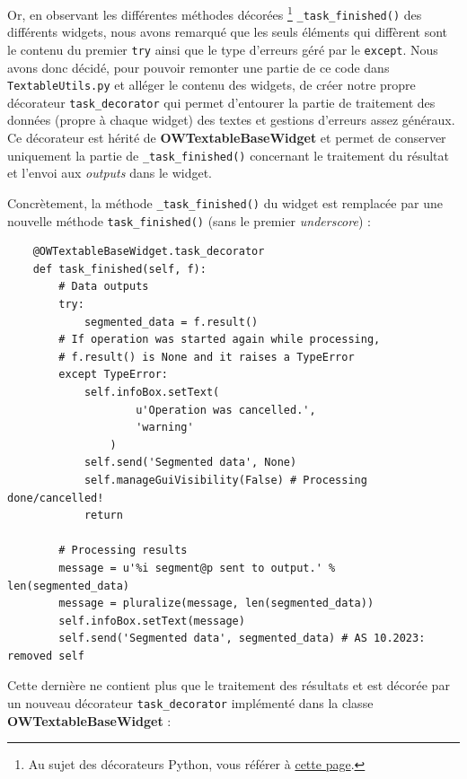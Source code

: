 \documentclass{article}
\begin{document}
\vspace{5mm}
Or, en observant les différentes méthodes décorées \footnote{Au sujet des décorateurs Python, vous référer à \href{https://www.geeksforgeeks.org/decorators-in-python/}{cette page}.} \texttt{\_task\_finished()} des différents widgets, nous avons remarqué que les seuls éléments qui diffèrent sont le contenu du premier \texttt{try} ainsi que le type d'erreurs géré par le \texttt{except}. Nous avons donc décidé, pour pouvoir remonter une partie de ce code dans \texttt{TextableUtils.py} et alléger le contenu des widgets, de créer notre propre décorateur \texttt{task\_decorator} qui permet d'entourer la partie de traitement des données (propre à chaque widget) des textes et gestions d'erreurs assez généraux. Ce décorateur est hérité de \textbf{OWTextableBaseWidget} et permet de conserver uniquement la partie de \texttt{\_task\_finished()} concernant le traitement du résultat et l'envoi aux \textit{outputs} dans le widget.

Concrètement, la méthode \texttt{\_task\_finished()} du widget est remplacée par une nouvelle méthode \texttt{task\_finished()} (sans le premier \textit{underscore}) : 

\begin{verbatim}
    @OWTextableBaseWidget.task_decorator
    def task_finished(self, f):
        # Data outputs
        try:
            segmented_data = f.result()
        # If operation was started again while processing,
        # f.result() is None and it raises a TypeError
        except TypeError:
            self.infoBox.setText(
                    u'Operation was cancelled.',
                    'warning'
                )
            self.send('Segmented data', None)
            self.manageGuiVisibility(False) # Processing done/cancelled!
            return

        # Processing results
        message = u'%i segment@p sent to output.' % len(segmented_data)
        message = pluralize(message, len(segmented_data))
        self.infoBox.setText(message)
        self.send('Segmented data', segmented_data) # AS 10.2023: removed self
\end{verbatim}

Cette dernière ne contient plus que le traitement des résultats et est décorée par un nouveau décorateur \texttt{task\_decorator} implémenté dans la classe \textbf{OWTextableBaseWidget} : 
\end{document}
